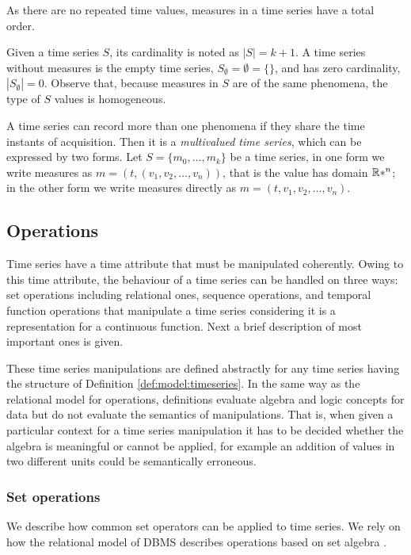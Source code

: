 As there are no repeated time values, measures in a time series have a
total order.

Given a time series $S$, its cardinality is noted as $|S|=k+1$.  A
time series without measures is the empty time series,
$S_\emptyset=\emptyset=\{\}$, and has zero cardinality,
$|S_\emptyset|=0$.  Observe that, because measures in $S$ are of the
same phenomena, the type of $S$ values is homogeneous.



A time series can record more than one phenomena if they share the
time instants of acquisition. Then it is a \emph{multivalued time
series}, which can be expressed by two forms. Let $S = \{m_0, \ldots,
m_k\}$ be a time series, in one form we write measures as
$m=(t,(v_1,v_2,\ldots,v_n))$, that is the value has domain $\mathbb{R}*^n$; in
the other form we write measures directly as
$m=(t,v_1,v_2,\ldots,v_n)$.




\subsection{Operations}

Time series have a time attribute that must be manipulated
coherently. Owing to this time attribute, the behaviour of a time
series can be handled on three ways:  set operations including
relational ones,  sequence operations, and  temporal function
operations that manipulate a time series considering it is a
representation for a continuous function. Next a brief description of
most important ones is given.


These time series manipulations are defined abstractly for any time
series having the structure of Definition \ref{def:model:timeseries}.
In the same way as the relational model for operations, definitions
evaluate algebra and logic concepts for data but do not evaluate the
semantics of manipulations. That is, when given a particular context
for a time series manipulation it has to be decided whether the
algebra is meaningful or cannot be applied, for example an addition of
values in two different units could be semantically erroneous.


\subsubsection{Set operations}

We describe how common set operators can be applied to time series. We
rely on how the relational model of DBMS describes operations based on
set algebra \cite{date:introduction}.


